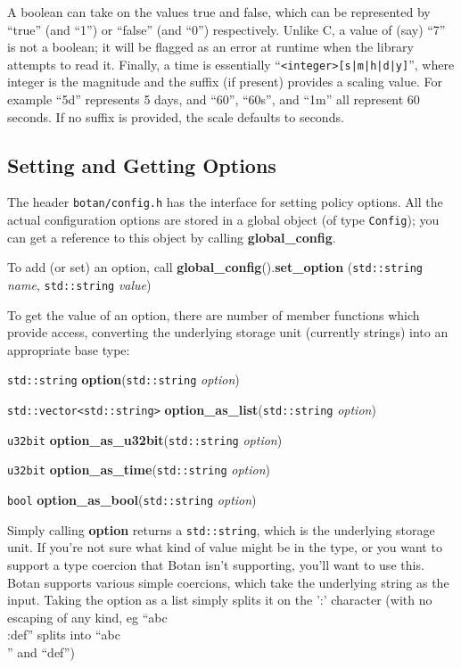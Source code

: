 \documentclass{article}
\newcommand{\filename}[1]{\texttt{#1}}
\newcommand{\function}[1]{\textbf{#1}}
\newcommand{\type}[1]{\texttt{#1}}
\renewcommand{\arg}[1]{\textsl{#1}}
\begin{document}
A boolean can take on the values true and false, which can be represented by
``true'' (and ``1'') or ``false'' (and ``0'') respectively. Unlike C, a value
of (say) ``7'' is not a boolean; it will be flagged as an error at runtime when
the library attempts to read it. Finally, a time is essentially
``\texttt{<integer>[s|m|h|d|y]}'', where integer is the magnitude and the
suffix (if present) provides a scaling value. For example ``5d'' represents 5
days, and ``60'', ``60s'', and ``1m'' all represent 60 seconds. If no suffix is
provided, the scale defaults to seconds.

\subsection{Setting and Getting Options}

The header \filename{botan/config.h} has the interface for setting
policy options. All the actual configuration options are stored in a
global object (of type \type{Config}); you can get a reference to this
object by calling \function{global\_config}.

To add (or set) an option, call
\function{global\_config}().\function{set\_option} (\type{std::string}
\arg{name}, \type{std::string} \arg{value})

To get the value of an option, there are number of member functions
which provide access, converting the underlying storage unit
(currently strings) into an appropriate base type:

\type{std::string} \function{option}(\type{std::string} \arg{option})

\type{std::vector<std::string>} \function{option\_as\_list}(\type{std::string}
\arg{option})

\type{u32bit} \function{option\_as\_u32bit}(\type{std::string} \arg{option})

\type{u32bit} \function{option\_as\_time}(\type{std::string} \arg{option})

\type{bool} \function{option\_as\_bool}(\type{std::string} \arg{option})

Simply calling \function{option} returns a \type{std::string}, which
is the underlying storage unit. If you're not sure what kind of value
might be in the type, or you want to support a type coercion that
Botan isn't supporting, you'll want to use this. Botan supports
various simple coercions, which take the underlying string as the
input. Taking the option as a list simply splits it on the ':'
character (with no escaping of any kind, eg ``abc\\:def'' splits into
``abc\\'' and ``def'')
\end{document}
